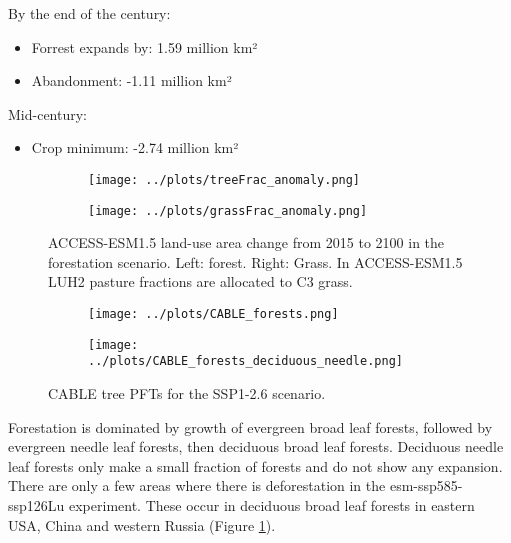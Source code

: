 \documentclass[]{article}
\begin{document}
By the end of the century:
\begin{itemize}
    \item Forrest expands by: 1.59 million km²
    \item Abandonment: -1.11 million km²
\end{itemize}
Mid-century:
\begin{itemize}
    \item Crop minimum: -2.74 million km²
\end{itemize}

\begin{figure}[H]
    \centering
    \begin{subfigure}[b]{0.45\linewidth}
        \texttt{[image: ../plots/treeFrac\_anomaly.png]}
    \end{subfigure}
    \begin{subfigure}[b]{0.45\linewidth}
        \texttt{[image: ../plots/grassFrac\_anomaly.png]}
    \end{subfigure}
    \caption{ACCESS-ESM1.5 land-use area change from 2015 to 2100 in the forestation scenario. Left: forest. Right: Grass. In ACCESS-ESM1.5 LUH2 pasture fractions are allocated to C3 grass.}
    \label{fig:land_use_map}
\end{figure}

\begin{figure}[H]
    \centering
    \begin{subfigure}[b]{0.45\linewidth}
        \texttt{[image: ../plots/CABLE\_forests.png]}
    \end{subfigure}
    \begin{subfigure}[b]{0.45\linewidth}
        \texttt{[image: ../plots/CABLE\_forests\_deciduous\_needle.png]}
    \end{subfigure}
    \caption{CABLE tree PFTs for the SSP1-2.6 scenario.}
    \label{fig:CABLE_PFTs}
\end{figure}

Forestation is dominated by growth of evergreen broad leaf forests, followed by evergreen needle leaf forests, then deciduous broad leaf forests.
Deciduous needle leaf forests only make a small fraction of forests and do not show any expansion.
There are only a few areas where there is deforestation in the esm-ssp585-ssp126Lu experiment.
These occur in deciduous broad leaf forests in eastern USA, China and western Russia (Figure \ref{fig:land_use_map}).
\end{document}
